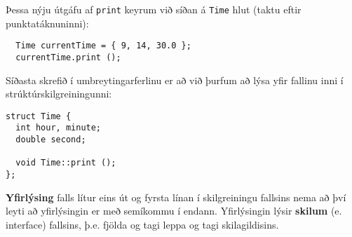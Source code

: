 Þessa nýju útgáfu af {\tt print} keyrum við síðan á {\tt Time} hlut (taktu eftir punktatáknuninni):

\begin{verbatim}
  Time currentTime = { 9, 14, 30.0 };
  currentTime.print ();
\end{verbatim}
%
Síðasta skrefið í umbreytingarferlinu er að við þurfum að lýsa yfir fallinu inni í strúktúrskilgreiningunni:

\begin{verbatim}
struct Time {
  int hour, minute;
  double second;

  void Time::print ();
};
\end{verbatim}
%
{\bf Yfirlýsing} falls lítur eins út og fyrsta línan í skilgreiningu fallsins nema að því leyti að yfirlýsingin er með semíkommu í endann.
Yfirlýsingin lýsir {\bf skilum} (e. interface) fallsins, þ.e. fjölda og tagi leppa og tagi skilagildisins.

